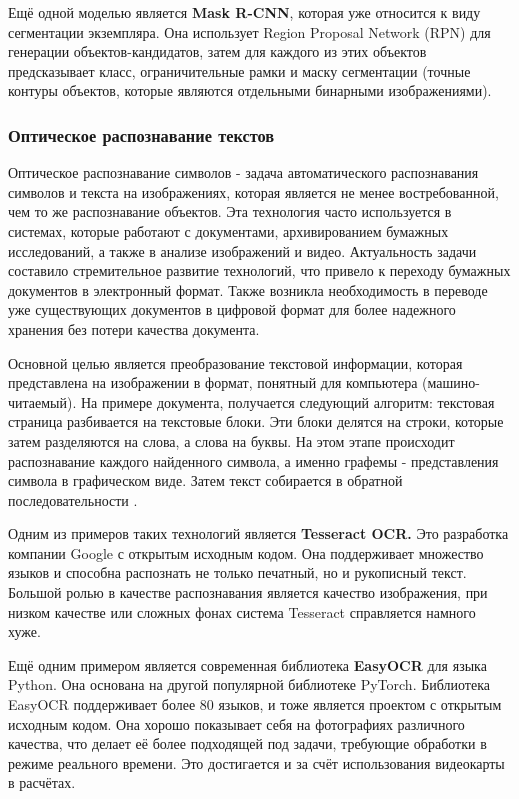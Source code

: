 \documentclass[a4paper,12pt]{article}
\begin{document}
Ещё одной моделью является \textbf{Mask R-CNN}, которая уже относится к виду сегментации экземпляра. Она использует Region Proposal Network (RPN) для генерации объектов-кандидатов, затем для каждого из этих объектов предсказывает класс, ограничительные рамки и маску сегментации (точные контуры объектов, которые являются отдельными бинарными изображениями).

\subsubsection{Оптическое распознавание текстов}

Оптическое распознавание символов - задача автоматического распознавания символов и текста на изображениях, которая является не менее востребованной, чем то же распознавание объектов.
Эта технология часто используется в системах, которые работают с документами, архивированием бумажных исследований, а также в анализе изображений и видео. Актуальность задачи составило стремительное развитие технологий, что привело к переходу бумажных документов в электронный формат. Также возникла необходимость в переводе уже существующих документов в цифровой формат для более надежного хранения без потери качества документа.

Основной целью является преобразование текстовой информации, которая представлена на изображении в формат, понятный для компьютера (машино-читаемый). На примере документа, получается следующий алгоритм: текстовая страница разбивается на текстовые блоки. Эти блоки делятся на строки, которые затем разделяются на слова, а слова на буквы. На этом этапе происходит распознавание каждого найденного символа, а именно графемы - представления символа в графическом виде. Затем текст собирается в обратной последовательности \cite{vashko}.

Одним из примеров таких технологий является \textbf{Tesseract OCR.} Это разработка компании Google с открытым исходным кодом. Она поддерживает множество языков и способна распознать не только печатный, но и рукописный текст. Большой ролью в качестве распознавания является качество изображения, при низком качестве или сложных фонах система Tesseract справляется намного хуже.

Ещё одним примером является современная библиотека \textbf{EasyOCR} для языка Python. Она основана на другой популярной библиотеке PyTorch. Библиотека EasyOCR поддерживает более 80 языков, и тоже является проектом с открытым исходным кодом. Она хорошо показывает себя на фотографиях различного качества, что делает её более подходящей под задачи, требующие обработки в режиме реального времени. Это достигается и за счёт использования видеокарты в расчётах.
\end{document}
